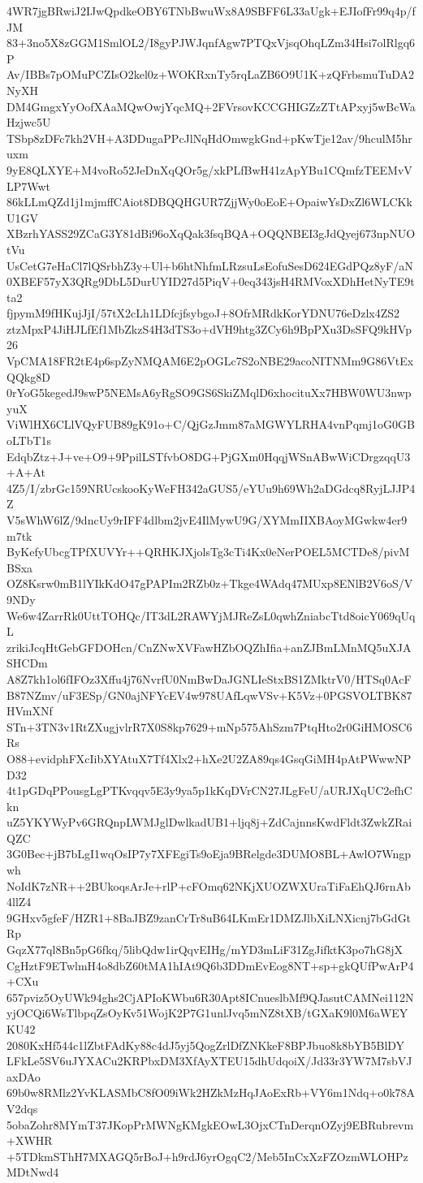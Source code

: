 4WR7jgBRwiJ2IJwQpdkeOBY6TNbBwuWx8A9SBFF6L33aUgk+EJIofFr99q4p/fJM
83+3no5X8zGGM1SmlOL2/I8gyPJWJqnfAgw7PTQxVjsqOhqLZm34Hsi7olRlgq6P
Av/IBBs7pOMuPCZIsO2kel0z+WOKRxnTy5rqLaZB6O9U1K+zQFrbsmuTuDA2NyXH
DM4GmgxYyOofXAaMQwOwjYqcMQ+2FVrsovKCCGHIGZzZTtAPxyj5wBcWaHzjwc5U
TSbp8zDFc7kh2VH+A3DDugaPPcJlNqHdOmwgkGnd+pKwTje12av/9hculM5hruxm
9yE8QLXYE+M4voRo52JeDnXqQOr5g/xkPLfBwH41zApYBu1CQmfzTEEMvVLP7Wwt
86kLLmQZd1j1mjmffCAiot8DBQQHGUR7ZjjWy0oEoE+OpaiwYsDxZl6WLCKkU1GV
XBzrhYASS29ZCaG3Y81dBi96oXqQak3fsqBQA+OQQNBEI3gJdQyej673npNUOtVu
UsCetG7eHaCl7lQSrbhZ3y+Ul+b6htNhfmLRzsuLsEofuSesD624EGdPQz8yF/aN
0XBEF57yX3QRg9DbL5DurUYID27d5PiqV+0eq343jsH4RMVoxXDhHetNyTE9tta2
fjpymM9fHKujJjI/57tX2cLh1LDfcjfsybgoJ+8OfrMRdkKorYDNU76eDzlx4ZS2
ztzMpxP4JiHJLfEf1MbZkzS4H3dTS3o+dVH9htg3ZCy6h9BpPXu3DsSFQ9kHVp26
VpCMA18FR2tE4p6spZyNMQAM6E2pOGLc7S2oNBE29acoNITNMm9G86VtExQQkg8D
0rYoG5kegedJ9swP5NEMsA6yRgSO9GS6SkiZMqlD6xhocituXx7HBW0WU3nwpyuX
ViWlHX6CLlVQyFUB89gK91o+C/QjGzJmm87aMGWYLRHA4vnPqmj1oG0GBoLTbT1s
EdqbZtz+J+ve+O9+9PpilLSTfvbO8DG+PjGXm0HqqjWSnABwWiCDrgzqqU3+A+At
4Z5/I/zbrGc159NRUcskooKyWeFH342aGUS5/eYUu9h69Wh2aDGdcq8RyjLJJP4Z
V5sWhW6lZ/9dncUy9rIFF4dlbm2jvE4IlMywU9G/XYMmIIXBAoyMGwkw4er9m7tk
ByKefyUbcgTPfXUVYr++QRHKJXjolsTg3cTi4Kx0eNerPOEL5MCTDe8/pivMBSxa
OZ8Ksrw0mB1lYIkKdO47gPAPIm2RZb0z+Tkge4WAdq47MUxp8ENlB2V6oS/V9NDy
We6w4ZarrRk0UttTOHQc/IT3dL2RAWYjMJReZsL0qwhZniabcTtd8oicY069qUqL
zrikiJcqHtGebGFDOHcn/CnZNwXVFawHZbOQZhIfia+anZJBmLMnMQ5uXJASHCDm
A8Z7kh1ol6fIFOz3Xffu4j76NvrfU0NmBwDaJGNLIeStxBS1ZMktrV0/HTSq0AcF
B87NZmv/uF3ESp/GN0ajNFYcEV4w978UAfLqwVSv+K5Vz+0PGSVOLTBK87HVmXNf
STn+3TN3v1RtZXugjvlrR7X0S8kp7629+mNp575AhSzm7PtqHto2r0GiHMOSC6Rs
O88+evidphFXcIibXYAtuX7Tf4Xlx2+hXe2U2ZA89qs4GsqGiMH4pAtPWwwNPD32
4t1pGDqPPousgLgPTKvqqv5E3y9ya5p1kKqDVrCN27JLgFeU/aURJXqUC2efhCkn
uZ5YKYWyPv6GRQnpLWMJglDwlkadUB1+ljq8j+ZdCajnnsKwdFldt3ZwkZRaiQZC
3G0Bec+jB7bLgI1wqOsIP7y7XFEgiTs9oEja9BRelgde3DUMO8BL+AwlO7Wngpwh
NoIdK7zNR++2BUkoqsArJe+rlP+cFOmq62NKjXUOZWXUraTiFaEhQJ6rnAb4llZ4
9GHxv5gfeF/HZR1+8BaJBZ9zanCrTr8uB64LKmEr1DMZJlbXiLNXicnj7bGdGtRp
GqzX77ql8Bn5pG6fkq/5libQdw1irQqvEIHg/mYD3mLiF31ZgJifktK3po7hG8jX
CgHztF9ETwlmH4o8dbZ60tMA1hIAt9Q6b3DDmEvEog8NT+sp+gkQUfPwArP4+CXu
657pviz5OyUWk94ghs2CjAPIoKWbu6R30Apt8ICnueslbMf9QJasutCAMNei112N
yjOCQi6WsTlbpqZsOyKv51WojK2P7G1unlJvq5mNZ8tXB/tGXaK9l0M6aWEYKU42
2080KxHf544c1lZbtFAdKy88c4dJ5yj5QogZrlDfZNKkeF8BPJbuo8k8bYB5BlDY
LFkLe5SV6uJYXACu2KRPbxDM3XfAyXTEU15dhUdqoiX/Jd33r3YW7M7sbVJaxDAo
69b0w8RMlz2YvKLASMbC8fO09iWk2HZkMzHqJAoExRb+VY6m1Ndq+o0k78AV2dqs
5obaZohr8MYmT37JKopPrMWNgKMgkEOwL3OjxCTnDerqnOZyj9EBRubrevm+XWHR
+5TDkmSThH7MXAGQ5rBoJ+h9rdJ6yrOgqC2/Meb5InCxXzFZOzmWLOHPzMDtNwd4
